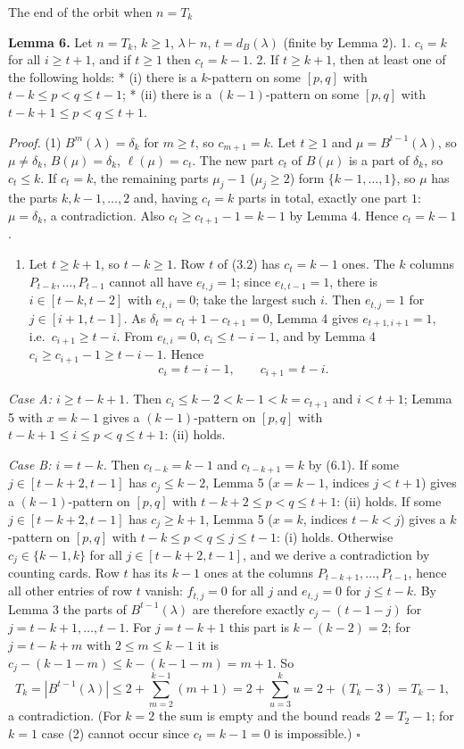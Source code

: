 The end of the orbit when \(n=T_k\)

\textbf{Lemma 6.} Let \(n=T_k\), \(k\ge1\), \(\lambda\vdash n\),
\(t=d_B(\lambda)\) (finite by Lemma 2). 1. \(c_i=k\) for all
\(i\ge t+1\), and if \(t\ge1\) then \(c_t=k-1\). 2. If \(t\ge k+1\),
then at least one of the following holds: * (i) there is a \(k\)-pattern
on some \([p,q]\) with \(t-k\le p<q\le t-1\); * (ii) there is a
\((k-1)\)-pattern on some \([p,q]\) with \(t-k+1\le p<q\le t+1\).

\emph{Proof.} (1) \(B^m(\lambda)=\delta_k\) for \(m\ge t\), so
\(c_{m+1}=k\). Let \(t\ge1\) and \(\mu=B^{t-1}(\lambda)\), so
\(\mu\ne\delta_k\), \(B(\mu)=\delta_k\), \(\ell(\mu)=c_t\). The new part
\(c_t\) of \(B(\mu)\) is a part of \(\delta_k\), so \(c_t\le k\). If
\(c_t=k\), the remaining parts \(\mu_j-1\) (\(\mu_j\ge2\)) form
\(\{k-1,\dots,1\}\), so \(\mu\) has the parts \(k,k-1,\dots,2\) and,
having \(c_t=k\) parts in total, exactly one part \(1\):
\(\mu=\delta_k\), a contradiction. Also \(c_t\ge c_{t+1}-1=k-1\) by
Lemma 4. Hence \(c_t=k-1\).

\begin{enumerate}
\def\labelenumi{(\arabic{enumi})}
\setcounter{enumi}{1}
\tightlist
\item
  Let \(t\ge k+1\), so \(t-k\ge1\). Row \(t\) of (3.2) has \(c_t=k-1\)
  ones. The \(k\) columns \(P_{t-k},\dots,P_{t-1}\) cannot all have
  \(e_{t,j}=1\); since \(e_{t,t-1}=1\), there is \(i\in[t-k,t-2]\) with
  \(e_{t,i}=0\); take the largest such \(i\). Then \(e_{t,j}=1\) for
  \(j\in[i+1,t-1]\). As \(\delta_t=c_t+1-c_{t+1}=0\), Lemma 4 gives
  \(e_{t+1,i+1}=1\), i.e.~\(c_{i+1}\ge t-i\). From \(e_{t,i}=0\),
  \(c_i\le t-i-1\), and by Lemma 4 \(c_i\ge c_{i+1}-1\ge t-i-1\). Hence
  \[c_i=t-i-1,\qquad c_{i+1}=t-i.\tag{6.1}\]
\end{enumerate}

\emph{Case A: \(i\ge t-k+1\).} Then \(c_i\le k-2<k-1<k=c_{t+1}\) and
\(i<t+1\); Lemma 5 with \(x=k-1\) gives a \((k-1)\)-pattern on \([p,q]\)
with \(t-k+1\le i\le p<q\le t+1\): (ii) holds.

\emph{Case B: \(i=t-k\).} Then \(c_{t-k}=k-1\) and \(c_{t-k+1}=k\) by
(6.1). If some \(j\in[t-k+2,t-1]\) has \(c_j\le k-2\), Lemma 5
(\(x=k-1\), indices \(j<t+1\)) gives a \((k-1)\)-pattern on \([p,q]\)
with \(t-k+2\le p<q\le t+1\): (ii) holds. If some \(j\in[t-k+2,t-1]\)
has \(c_j\ge k+1\), Lemma 5 (\(x=k\), indices \(t-k<j\)) gives a
\(k\)-pattern on \([p,q]\) with \(t-k\le p<q\le j\le t-1\): (i) holds.
Otherwise \(c_j\in\{k-1,k\}\) for all \(j\in[t-k+2,t-1]\), and we derive
a contradiction by counting cards. Row \(t\) has its \(k-1\) ones at the
columns \(P_{t-k+1},\dots,P_{t-1}\), hence all other entries of row
\(t\) vanish: \(f_{t,j}=0\) for all \(j\) and \(e_{t,j}=0\) for
\(j\le t-k\). By Lemma 3 the parts of \(B^{t-1}(\lambda)\) are therefore
exactly \(c_j-(t-1-j)\) for \(j=t-k+1,\dots,t-1\). For \(j=t-k+1\) this
part is \(k-(k-2)=2\); for \(j=t-k+m\) with \(2\le m\le k-1\) it is
\(c_j-(k-1-m)\le k-(k-1-m)=m+1\). So
\[T_k=|B^{t-1}(\lambda)|\le 2+\sum_{m=2}^{k-1}(m+1)=2+\sum_{u=3}^{k}u=2+(T_k-3)=T_k-1,\]
a contradiction. (For \(k=2\) the sum is empty and the bound reads
\(2=T_2-1\); for \(k=1\) case (2) cannot occur since \(c_t=k-1=0\) is
impossible.) \(\square\)

